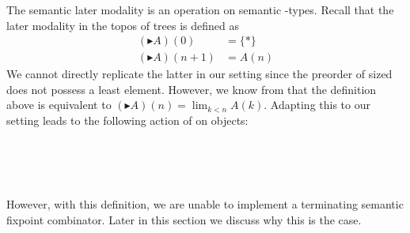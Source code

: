 The semantic later modality is
an operation  on semantic -types.
Recall that the later modality in the topos of trees \cite{BMSS-synthetic} is defined as
\begin{align*}
(\blacktriangleright A) (0) & = \{ * \} \\
(\blacktriangleright A) (n+1) & = A(n)
\end{align*}
We cannot directly replicate the latter in our setting since the preorder of sized does not possess a least element. 
However, we know from \cite{BMSS-synthetic} that the definition above is equivalent to
$(\blacktriangleright A) (n) = \lim_{k < n} A (k)$. 
Adapting this to our setting leads to the following action of  on objects:
\begin{code}%
\>[0]\AgdaSpace{}%
\AgdaSpace{}%
\AgdaSymbol{(}\AgdaSpace{}%
\AgdaSymbol{:}\AgdaSpace{}%
\AgdaSpace{}%
\AgdaSymbol{)}\AgdaSpace{}%
\AgdaSymbol{(}\AgdaSpace{}%
\AgdaSymbol{:}\AgdaSpace{}%
\AgdaSymbol{)}\AgdaSpace{}%
\AgdaSymbol{:}\AgdaSpace{}%
\AgdaSpace{}%
\<%
\\
\>[0][@{}l@{\AgdaIndent{0}}]%
\>[2]\<%
\\
\>[2][@{}l@{\AgdaIndent{0}}]%
\>[4]\AgdaSpace{}%
\AgdaSymbol{:}\AgdaSpace{}%
\AgdaSymbol{(}\AgdaSpace{}%
\AgdaSymbol{:}\AgdaSpace{}%
\AgdaSpace{}%
\AgdaSymbol{)}\AgdaSpace{}%
\AgdaSpace{}%
\AgdaSpace{}%
\AgdaSpace{}%
\<%
\\
%
\>[4]\AgdaSpace{}%
\AgdaSymbol{:}\AgdaSpace{}%
\AgdaSymbol{(}\AgdaSpace{}%
\AgdaSymbol{:}\AgdaSpace{}%
\AgdaSpace{}%
\AgdaSymbol{)}\AgdaSpace{}%
\AgdaSymbol{(}\AgdaSpace{}%
\AgdaSymbol{:}\AgdaSpace{}%
\AgdaSpace{}%
\AgdaSymbol{(}\AgdaSpace{}%
\AgdaSymbol{))}\AgdaSpace{}%
\AgdaSpace{}%
\AgdaSpace{}%
\AgdaSpace{}%
\AgdaSpace{}%
\AgdaSpace{}%
\AgdaSymbol{(}\AgdaSpace{}%
\AgdaSymbol{)}\AgdaSpace{}%
\AgdaSpace{}%
\AgdaSpace{}%
\<%
\end{code}
However, with this definition, we are unable to
implement a terminating semantic fixpoint combinator.
Later in this section we discuss why this is the case.

